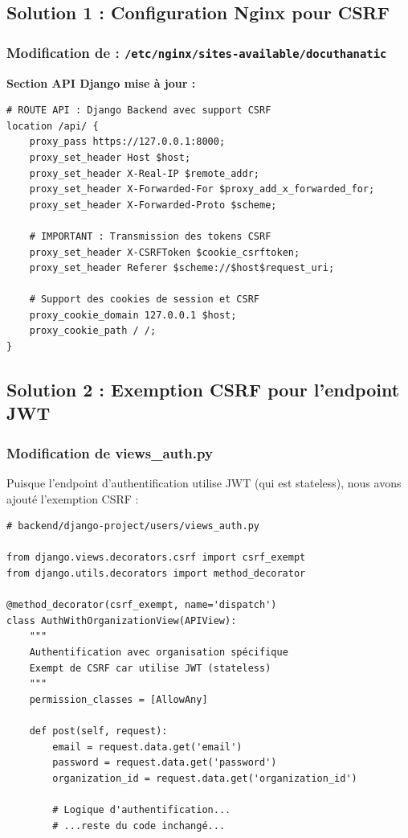 \documentclass[12pt,a4paper]{article}
\begin{document}
\subsection{Solution 1 : Configuration Nginx pour CSRF}

\subsubsection{Modification de : \texttt{/etc/nginx/sites-available/docuthanatic}}

\textbf{Section API Django mise à jour :}

\begin{lstlisting}[style=nginx, caption={Configuration Nginx pour transmission CSRF}]
# ROUTE API : Django Backend avec support CSRF
location /api/ {
    proxy_pass https://127.0.0.1:8000;
    proxy_set_header Host $host;
    proxy_set_header X-Real-IP $remote_addr;
    proxy_set_header X-Forwarded-For $proxy_add_x_forwarded_for;
    proxy_set_header X-Forwarded-Proto $scheme;
    
    # IMPORTANT : Transmission des tokens CSRF
    proxy_set_header X-CSRFToken $cookie_csrftoken;
    proxy_set_header Referer $scheme://$host$request_uri;
    
    # Support des cookies de session et CSRF
    proxy_cookie_domain 127.0.0.1 $host;
    proxy_cookie_path / /;
}
\end{lstlisting}

\subsection{Solution 2 : Exemption CSRF pour l'endpoint JWT}

\subsubsection{Modification de views\_auth.py}

Puisque l'endpoint d'authentification utilise JWT (qui est stateless), nous avons ajouté l'exemption CSRF :

\begin{lstlisting}[style=python, caption={Exemption CSRF pour l'authentification JWT}]
# backend/django-project/users/views_auth.py

from django.views.decorators.csrf import csrf_exempt
from django.utils.decorators import method_decorator

@method_decorator(csrf_exempt, name='dispatch')
class AuthWithOrganizationView(APIView):
    """
    Authentification avec organisation spécifique
    Exempt de CSRF car utilise JWT (stateless)
    """
    permission_classes = [AllowAny]
    
    def post(self, request):
        email = request.data.get('email')
        password = request.data.get('password')
        organization_id = request.data.get('organization_id')
        
        # Logique d'authentification...
        # ...reste du code inchangé...
\end{lstlisting}
\end{document}
